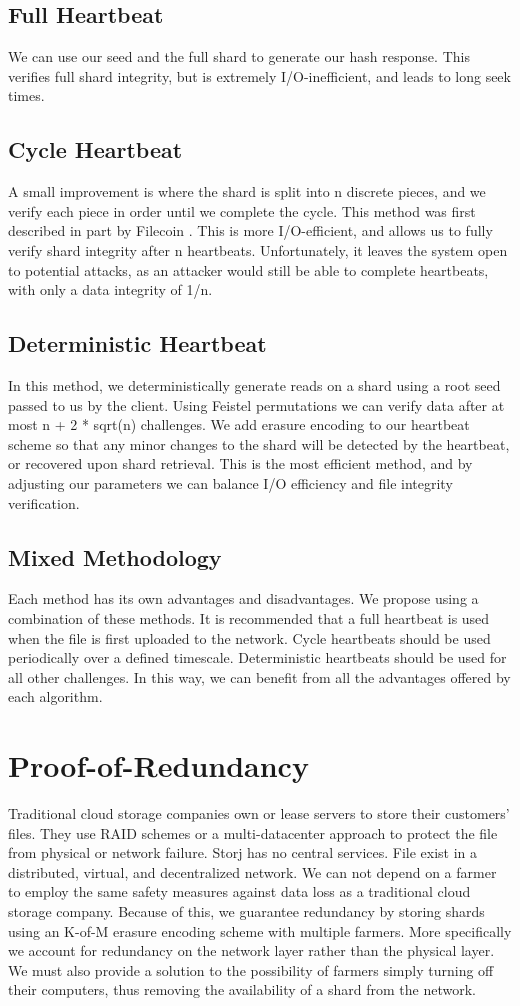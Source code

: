 \documentclass[a4paper,10pt]{article}
\begin{document}
\subsection{Full Heartbeat}
We can use our seed and the full shard to generate our hash response. This verifies full shard integrity, but is extremely I/O-inefficient, and leads to long seek times.
\subsection{Cycle Heartbeat}
A small improvement is where the shard is split into n discrete pieces, and we verify each piece in order until we complete the cycle. This method was first described in part by Filecoin \cite{11}. This is more I/O-efficient, and allows us to fully verify shard integrity after n heartbeats. Unfortunately, it leaves the system open to potential attacks, as an attacker would still be able to complete heartbeats, with only a data integrity of 1/n.
\subsection{Deterministic Heartbeat}
In this method, we deterministically generate reads on a shard using a root seed passed to us by the client. Using Feistel permutations we can verify data after at most n + 2 * sqrt(n) challenges. We add erasure encoding to our heartbeat scheme so that any minor changes to the shard will be detected by the heartbeat, or recovered upon shard retrieval. This is the most efficient method, and by adjusting our parameters we can balance I/O efficiency and file integrity verification.  
\subsection{Mixed Methodology}
Each method has its own advantages and disadvantages. We propose using a combination of these methods. It is recommended that a full heartbeat is used when the file is first uploaded to the network. Cycle heartbeats should be used periodically over a defined timescale. Deterministic heartbeats should be used for all other challenges. In this way, we can benefit from all the advantages offered by each algorithm. 

\section{Proof-of-Redundancy}
Traditional cloud storage companies own or lease servers to store their customers’ files. They use RAID schemes or a multi-datacenter approach to protect the file from physical or network failure. Storj has no central services. File exist in a distributed, virtual, and decentralized network. We can not depend on a farmer to employ the same safety measures against data loss as a traditional cloud storage company. Because of this, we guarantee redundancy by storing shards using an K-of-M erasure encoding scheme with multiple farmers. More specifically we account for redundancy on the network layer rather than the physical layer. We must also provide a solution to the possibility of farmers simply turning off their computers, thus removing the availability of a shard from the network. \\
\end{document}
